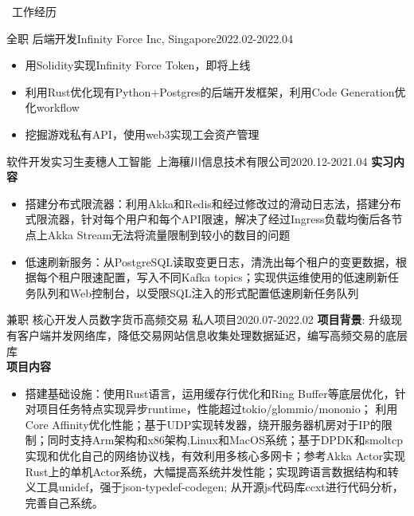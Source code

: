 \documentclass[UTF8]{resume}
\begin{document}
\begin{rSection}{\faBriefcase~工作经历}
\begin{rExperience}{全职 后端开发}{Infinity Force Inc, Singapore}{2022.02-2022.04}
\begin{itemize}
            \item 用Solidity实现Infinity Force Token，即将上线
            \item 利用Rust优化现有Python+Postgres的后端开发框架，利用Code Generation优化workflow
            \item 挖掘游戏私有API，使用web3实现工会资产管理
        \end{itemize}
    \end{rExperience}
    \begin{rExperience}{软件开发实习生}{麦穗人工智能~上海穰川信息技术有限公司}{2020.12-2021.04}
        \textbf{实习内容}
        \begin{itemize}
            \itemsep -0.5em \vspace{-0.5em}
            \item 搭建分布式限流器：利用Akka和Redis和经过修改过的滑动日志法，搭建分布式限流器，针对每个用户和每个API限速，解决了经过Ingress负载均衡后各节点上Akka Stream无法将流量限制到较小的数目的问题
            \item 低速刷新服务：从PostgreSQL读取变更日志，清洗出每个租户的变更数据，根据每个租户限速配置，写入不同Kafka topics；实现供运维使用的低速刷新任务队列和Web控制台，以受限SQL注入的形式配置低速刷新任务队列
        \end{itemize}
    \end{rExperience}
    \begin{rExperience}{兼职 核心开发人员}{数字货币高频交易 私人项目}{2020.07-2022.02}
        \textbf{项目背景}:
        升级现有客户端并发网络库，降低交易网站信息收集处理数据延迟，编写高频交易的底层库\\
        \textbf{项目内容}
        \begin{itemize}
            \itemsep -0.5em \vspace{-0.5em}
            \item 搭建基础设施：使用Rust语言，运用缓存行优化和Ring Buffer等底层优化，针对项目任务特点实现异步runtime，性能超过tokio/glommio/mononio； 利用Core Affinity优化性能；基于UDP实现转发器，绕开服务器机房对于IP的限制；同时支持Arm架构和x86架构,Linux和MacOS系统；基于DPDK和smoltcp实现和优化自己的网络协议栈，有效利用多核心多网卡；参考Akka Actor实现Rust上的单机Actor系统，大幅提高系统并发性能；实现跨语言数据结构和转义工具unidef，强于json-typedef-codegen; 从开源js代码库ccxt进行代码分析，完善自己系统。

\end{itemize}
\end{rExperience}
\end{rSection}
\end{document}
